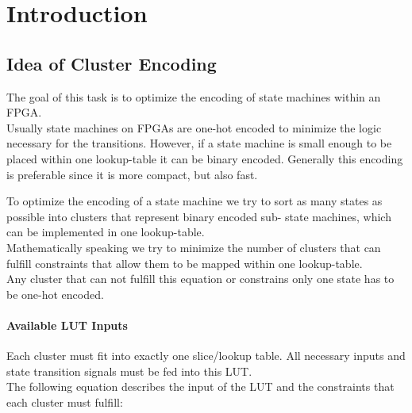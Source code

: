 \chapter{Introduction}
\label{cha:introduction}





\section{Idea of Cluster Encoding}
\label{sec:clusterSearch}

The goal of this task is to optimize the encoding of state machines within an FPGA.\\
Usually state machines on FPGAs are one-hot encoded to minimize the logic necessary for the transitions. However, if a state machine is small enough to be placed within one lookup-table it can be binary encoded. Generally this encoding is preferable since it is more compact, but also fast.

To optimize the encoding of a state machine we try to sort as many states as possible into clusters that represent binary encoded sub- state machines, which can be implemented in one lookup-table.\\
Mathematically speaking we try to minimize the number of clusters that can fulfill constraints that allow them to be mapped within one lookup-table.\\
Any cluster that can not fulfill this equation or constrains only one state has to be one-hot encoded.


\subsubsection{Available LUT Inputs}
\label{subsubsec:LUTInputs}
Each cluster must fit into exactly one slice/lookup table. All necessary inputs and state transition signals must be fed into this LUT. \\
The following equation describes the input of the LUT and the constraints that each cluster must fulfill:

